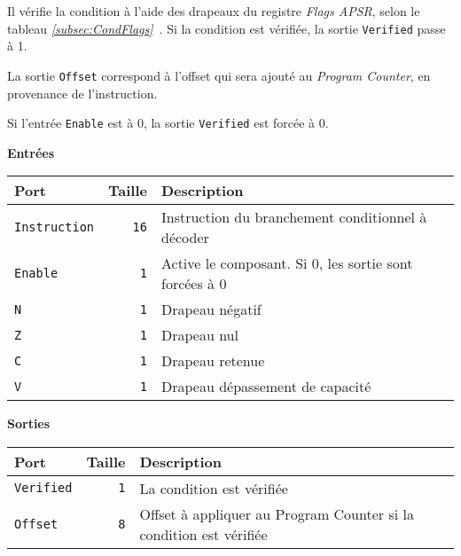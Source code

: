\documentclass{article}
\begin{document}
    Il vérifie la condition à l'aide des drapeaux du registre \textit{Flags APSR}, selon le tableau  \textit{\ref{subsec:CondFlags}~}.
    Si la condition est vérifiée, la sortie \texttt{Verified} passe à 1.

    La sortie \texttt{Offset} correspond à l'offset qui sera ajouté au \textit{Program Counter}, en provenance de l'instruction.

    Si l'entrée \texttt{Enable} est à 0, la sortie \texttt{Verified} est forcée à 0.


    \textbf{Entrées}\\

    \begin{tabular}{|l|r|l|}
        \hline
        \textbf{Port}       & \textbf{Taille} & \textbf{Description}                                   \\
        \hline

        \texttt{Instruction} & \texttt{16}     & Instruction du branchement conditionnel à décoder      \\
        \hline
        \texttt{Enable}     & \texttt{1}      & Active le composant.
        Si 0, les sortie sont forcées à 0 \\
        \hline
        \texttt{N}          & \texttt{1}      & Drapeau négatif                                        \\
        \hline
        \texttt{Z}          & \texttt{1}      & Drapeau nul                                            \\
        \hline
        \texttt{C}          & \texttt{1}      & Drapeau retenue                                        \\
        \hline
        \texttt{V}          & \texttt{1}      & Drapeau dépassement de capacité                        \\


        \hline
    \end{tabular}

    \vspace{1em}
    \textbf{Sorties}\\

    \begin{tabular}{|l|r|l|}
        \hline
        \textbf{Port}      & \textbf{Taille} & \textbf{Description}                                               \\

        \hline
        \texttt{Verified} & \texttt{1}      & La condition est vérifiée                                          \\
        \hline
        \texttt{Offset}  & \texttt{8}      & Offset à appliquer au Program Counter si la condition est vérifiée \\

        \hline
    \end{tabular}
\end{document}
